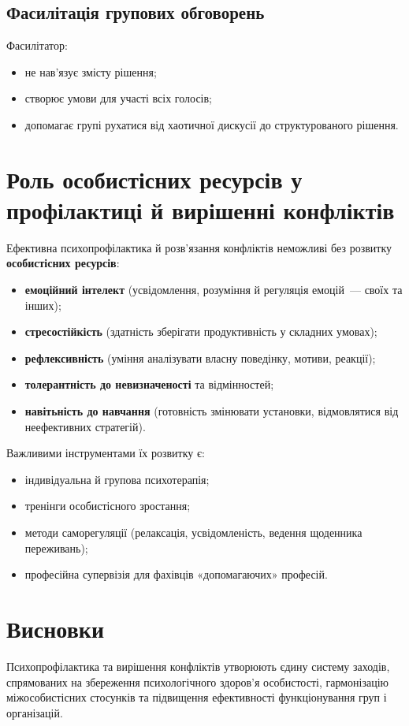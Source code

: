 \documentclass[12pt,a4paper]{article}
\begin{document}
    \subsection*{Фасилітація групових обговорень}
    Фасилітатор:
    \begin{itemize}
        \item не нав’язує змісту рішення;
        \item створює умови для участі всіх голосів;
        \item допомагає групі рухатися від хаотичної дискусії до структурованого рішення.
    \end{itemize}

    \section*{Роль особистісних ресурсів у профілактиці й вирішенні конфліктів}
    Ефективна психопрофілактика й розв’язання конфліктів неможливі без розвитку 
    \textbf{особистісних ресурсів}:
    \begin{itemize}
        \item \textbf{емоційний інтелект} (усвідомлення, розуміння й регуляція емоцій~--- своїх та інших);
        \item \textbf{стресостійкість} (здатність зберігати продуктивність у складних умовах);
        \item \textbf{рефлексивність} (уміння аналізувати власну поведінку, мотиви, реакції);
        \item \textbf{толерантність до невизначеності} та відмінностей;
        \item \textbf{навітьність до навчання} (готовність змінювати установки, відмовлятися від неефективних стратегій).
    \end{itemize}

    Важливими інструментами їх розвитку є:
    \begin{itemize}
        \item індивідуальна й групова психотерапія;
        \item тренінги особистісного зростання;
        \item методи саморегуляції (релаксація, усвідомленість, ведення щоденника переживань);
        \item професійна супервізія для фахівців «допомагаючих» професій.
    \end{itemize}

    \section*{Висновки}
    Психопрофілактика та вирішення конфліктів утворюють єдину систему заходів, 
    спрямованих на збереження психологічного здоров’я особистості, гармонізацію міжособистісних стосунків 
    та підвищення ефективності функціонування груп і організацій.
\end{document}
